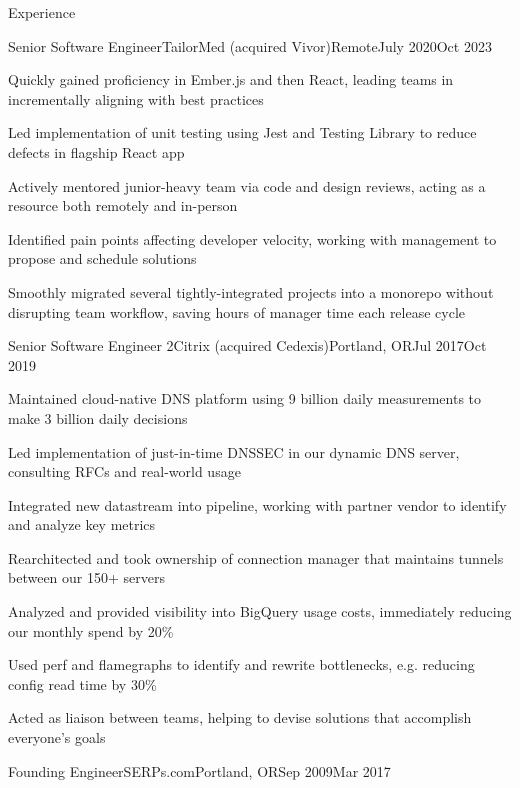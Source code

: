 \documentclass[letterpaper,12pt]{article}
\begin{document}
\begin{paracol}{2}
\vspace{1.5em}

\begin{rsection}{Experience}
\begin{rexperienceitem}{Senior Software Engineer}{TailorMed (acquired Vivor)}{Remote}{July 2020}{Oct 2023}
  \item Quickly gained proficiency in Ember.js and then React, leading teams in incrementally aligning with best practices
  \item Led implementation of unit testing using Jest and Testing Library to reduce defects in flagship React app
  \item Actively mentored junior-heavy team via code and design reviews, acting as a resource both remotely and in-person
  \item Identified pain points affecting developer velocity, working with management to propose and schedule solutions
  \item Smoothly migrated several tightly-integrated projects into a monorepo without disrupting team workflow, saving hours of manager time each release cycle
\end{rexperienceitem}
\begin{rexperienceitem}{Senior Software Engineer 2}{Citrix (acquired Cedexis)}{Portland, OR}{Jul 2017}{Oct 2019}
  \item Maintained cloud-native DNS platform using 9 billion daily measurements to make 3 billion daily decisions
  \item Led implementation of just-in-time DNSSEC in our dynamic DNS server, consulting RFCs and real-world usage
  \item Integrated new datastream into pipeline, working with partner vendor to identify and analyze key metrics
  \item Rearchitected and took ownership of connection manager that maintains tunnels between our 150+ servers
  \item Analyzed and provided visibility into BigQuery usage costs, immediately reducing our monthly spend by 20\%
  \item Used perf and flamegraphs to identify and rewrite bottlenecks, e.g. reducing config read time by 30\%
  \item Acted as liaison between teams, helping to devise solutions that accomplish everyone's goals
\end{rexperienceitem}
\begin{rexperienceitem}{Founding Engineer}{SERPs.com}{Portland, OR}{Sep 2009}{Mar 2017}

\end{rexperienceitem}
\end{rsection}
\end{paracol}
\end{document}
